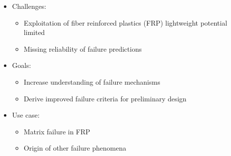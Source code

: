 \begin{frame}[t]{\secname}%
  
\begin{columns}[t]
  \begin{column}{0.57\textwidth}
    \begin{itemize}
      \item<1-> Challenges:
        \begin{itemize}
          \item<1-> Exploitation of fiber reinforced plastics (FRP) lightweight potential limited
          \item<1-> Missing reliability of failure predictions
        \end{itemize}
      \item<2-> Goals:
        \begin{itemize}
          \item<2-> Increase understanding of failure mechanisms
          \item<2-> Derive improved failure criteria for preliminary design
        \end{itemize}
      \item<3-> Use case: 
        \begin{itemize}
          \item<3-> Matrix failure in FRP
          \item<3-> Origin of other failure phenomena
        \end{itemize}
    \end{itemize}
  \end{column}
  \begin{column}{0.43\textwidth}
\end{column}
\end{columns}
\end{frame}
